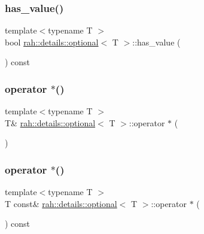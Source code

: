\subsubsection{\texorpdfstring{has\_value()}{has\_value()}}
{\footnotesize\ttfamily template$<$typename T $>$ \\
bool \mbox{\hyperlink{structrah_1_1details_1_1optional}{rah\+::details\+::optional}}$<$ T $>$\+::has\+\_\+value (\begin{DoxyParamCaption}{ }\end{DoxyParamCaption}) const\hspace{0.3cm}{\ttfamily [inline]}}

\mbox{\label{structrah_1_1details_1_1optional_a323ce53e8877c68ecf4f3d19bb902efa}} 
\subsubsection{\texorpdfstring{operator $\ast$()}{operator *()}\hspace{0.1cm}{\footnotesize\ttfamily [1/2]}}
{\footnotesize\ttfamily template$<$typename T $>$ \\
T\& \mbox{\hyperlink{structrah_1_1details_1_1optional}{rah\+::details\+::optional}}$<$ T $>$\+::operator $\ast$ (\begin{DoxyParamCaption}{ }\end{DoxyParamCaption})\hspace{0.3cm}{\ttfamily [inline]}}

\mbox{\label{structrah_1_1details_1_1optional_ab479ebfb4ea17aec5147b7aa897ad1d6}} 
\subsubsection{\texorpdfstring{operator $\ast$()}{operator *()}\hspace{0.1cm}{\footnotesize\ttfamily [2/2]}}
{\footnotesize\ttfamily template$<$typename T $>$ \\
T const\& \mbox{\hyperlink{structrah_1_1details_1_1optional}{rah\+::details\+::optional}}$<$ T $>$\+::operator $\ast$ (\begin{DoxyParamCaption}{ }\end{DoxyParamCaption}) const\hspace{0.3cm}{\ttfamily [inline]}}

